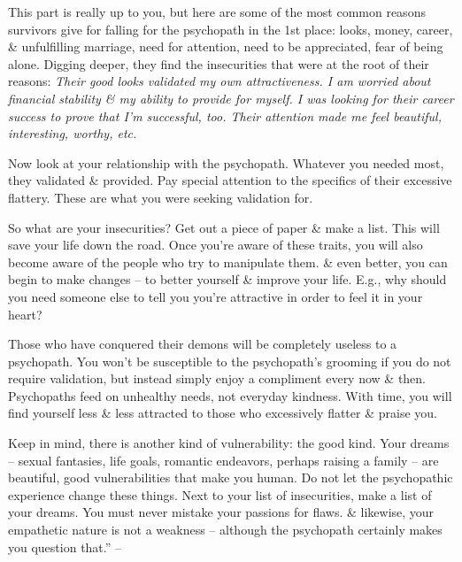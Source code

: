 \documentclass{article}
\numberwithin{equation}{section}
\begin{document}
This part is really up to you, but here are some of the most common reasons survivors give for falling for the psychopath in the 1st place: looks, money, career, \& unfulfilling marriage, need for attention, need to be appreciated, fear of being alone. Digging deeper, they find the insecurities that were at the root of their reasons: \textit{Their good looks validated my own attractiveness. I am worried about financial stability \& my ability to provide for myself. I was looking for their career success to prove that I'm successful, too. Their attention made me feel beautiful, interesting, worthy, etc.}

Now look at your relationship with the psychopath. Whatever you needed most, they validated \& provided. Pay special attention to the specifics of their excessive flattery. These are what you were seeking validation for.

So what are your insecurities? Get out a piece of paper \& make a list. This will save your life down the road. Once you're aware of these traits, you will also become aware of the people who try to manipulate them. \& even better, you can begin to make changes -- to better yourself \& improve your life. E.g., why should you need someone else to tell you you're attractive in order to feel it in your heart?

Those who have conquered their demons will be completely useless to a psychopath. You won't be susceptible to the psychopath's grooming if you do not require validation, but instead simply enjoy a compliment every now \& then. Psychopaths feed on unhealthy needs, not everyday kindness. With time, you will find yourself less \& less attracted to those who excessively flatter \& praise you.

Keep in mind, there is another kind of vulnerability: the good kind. Your dreams -- sexual fantasies, life goals, romantic endeavors, perhaps raising a family -- are beautiful, good vulnerabilities that make you human. Do not let the psychopathic experience change these things. Next to your list of insecurities, make a list of your dreams. You must never mistake your passions for flaws. \& likewise, your empathetic nature is not a weakness -- although the psychopath certainly makes you question that.'' -- \cite[pp. 149--150]{MacKenzie2015}
\end{document}
